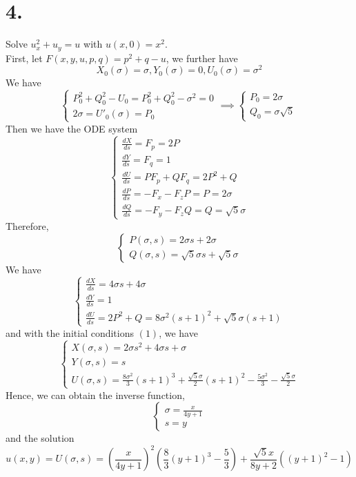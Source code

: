 \documentclass[11pt]{article}
\theoremstyle{mystyle}
\theoremstyle{definition}
\begin{document}
\section*{4.}
Solve $u_x^2 + u_y = u$ with $u(x,0) = x^2$. \\
First, let $F(x,y,u,p,q) = p^2 + q - u$, we further have
\begin{equation}
  X_0(\sigma) = \sigma, Y_0(\sigma) = 0, U_0(\sigma) = \sigma^2 
\end{equation}
We have
\[
  \begin{cases}
    P_0^2 + Q_0^2 - U_0 = P_0^2 + Q_0^2 - \sigma^2 = 0 \\
    2\sigma = U'_0(\sigma) = P_0
  \end{cases}
  \implies 
  \begin{cases}
    P_0 = 2\sigma \\
    Q_0 = \sigma \sqrt{5} 
  \end{cases}
\]
Then we have the ODE system 
\[
  \begin{cases}
    \displaystyle\frac{dX}{ds} = F_p = 2P \\
    \displaystyle\frac{dY}{ds} = F_q = 1 \\
    \displaystyle\frac{dU}{ds} = PF_p + QF_q = 2P^2 + Q \\
    \displaystyle\frac{dP}{ds} = -F_x - F_z P  =  P = 2 \sigma\\
    \displaystyle\frac{dQ}{ds} = -F_y - F_z Q = Q = \sqrt{5} \sigma 
  \end{cases}
\]
Therefore, 
\[
  \begin{cases}  
    P(\sigma, s) = 2\sigma s + 2 \sigma \\
    Q(\sigma, s) = \sqrt{5}\sigma s + \sqrt{5}\sigma
  \end{cases}
\]
We have 
\[
  \begin{cases}
    \displaystyle\frac{dX}{ds} = 4 \sigma s  + 4 \sigma \\ 
    \displaystyle\frac{dY}{ds} = 1 \\
    \displaystyle\frac{dU}{ds} = 2P^2 + Q = 8\sigma^2 (s+1)^2 + \sqrt{5} \sigma (s+1)
  \end{cases}
\]
and with the initial conditions $(1)$, we have 
\[
  \begin{cases}
    X(\sigma,s)= 2 \sigma s^2 + 4 \sigma s + \sigma \\
    Y(\sigma, s)= s \\
    U(\sigma, s)= \displaystyle\frac{8\sigma^2}{3}(s+1)^3 + \displaystyle\frac{\sqrt{5}\sigma}{2} (s+1)^2 - \displaystyle\frac{5\sigma^2}{3} - \displaystyle\frac{\sqrt{5}\sigma}{2} 
  \end{cases}
\]
Hence, we can obtain the inverse function, 
\[
  \begin{cases}
    \sigma = \displaystyle\frac{x}{4y+1}\\
    s = y
  \end{cases}
\]
and the solution  
\[
  u(x,y) = U(\sigma, s) = \left(\frac{x}{4y+1}\right)^2 \left(\displaystyle\frac{8}{3} (y+1)^3  - \displaystyle\frac{5}{3}\right) + \displaystyle\frac{\sqrt{5}x}{8y+2} ((y+1)^2 - 1) 
\]
\pagebreak
\end{document}
